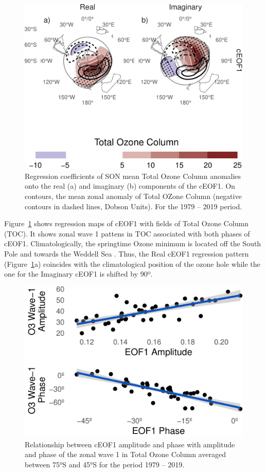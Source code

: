 \documentclass[smallextended]{svjour3}       %
\begin{document}
\begin{figure}
\centering
\includegraphics{../figures/o3-regr-1.pdf}
\caption{\label{fig:o3-regr}Regression coefficients of SON mean Total Ozone Column anomalies onto the real (a) and imaginary (b) components of the cEOF1. On contours, the mean zonal anomaly of Total OZone Column (negative contours in dashed lines, Dobson Units). For the 1979 -- 2019 period.}
\end{figure}

Figure~\ref{fig:o3-regr} shows regression maps of cEOF1 with fields of Total Ozone Column (TOC). It shows zonal wave 1 pattens in TOC associated with both phases of cEOF1. Climatologically, the springtime Ozone minimum is located off the South Pole and towards the Weddell Sea \citep{wirth1993}. Thus, the Real cEOF1 regression pattern (Figure~\ref{fig:o3-regr}a) coincides with the climatological position of the ozone hole while the one for the Imaginary cEOF1 is shifted by 90º.



\begin{figure}
\centering
\includegraphics{../figures/wave1-o3-1.pdf}
\caption{\label{fig:wave1-o3}Relationship between cEOF1 amplitude and phase with amplitude and phase of the zonal wave 1 in Total Ozone Column averaged between 75°S and 45°S for the period 1979 -- 2019.}
\end{figure}
\end{document}
